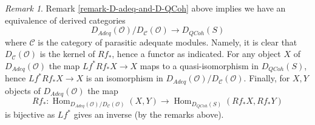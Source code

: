 \documentclass{stacks-project}
\theoremstyle{plain}
\theoremstyle{definition}
\theoremstyle{remark}
\newtheorem{remark}[subsection]{Remark}
\numberwithin{equation}{subsection}
\def\Hom{\mathop{\mathrm{Hom}}\nolimits}
\def\QCoh{\mathit{QCoh}}
\begin{document}
\begin{remark}
\label{remark-conclusion}
Remark \ref{remark-D-adeq-and-D-QCoh}
above implies we have an equivalence of derived categories
$$
D_{\textit{Adeq}}(\mathcal{O})/D_\mathcal{C}(\mathcal{O})
\longrightarrow
D_\QCoh(S)
$$
where $\mathcal{C}$ is the category of parasitic adequate modules.
Namely, it is clear that $D_\mathcal{C}(\mathcal{O})$ is the kernel
of $Rf_*$, hence a functor as indicated. For any object $X$ of
$D_{\textit{Adeq}}(\mathcal{O})$ the map $Lf^*Rf_*X \to X$ maps
to a quasi-isomorphism in $D_\QCoh(S)$, hence
$Lf^*Rf_*X \to X$ is an isomorphism in
$D_{\textit{Adeq}}(\mathcal{O})/D_\mathcal{C}(\mathcal{O})$.
Finally, for $X, Y$ objects of $D_{\textit{Adeq}}(\mathcal{O})$
the map
$$
Rf_* :
\Hom_{D_{\textit{Adeq}}(\mathcal{O})/D_\mathcal{C}(\mathcal{O})}(X, Y)
\to
\Hom_{D_\QCoh(S)}(Rf_*X, Rf_*Y)
$$
is bijective as $Lf^*$ gives an inverse (by the remarks above).
\end{remark}













\end{document}
